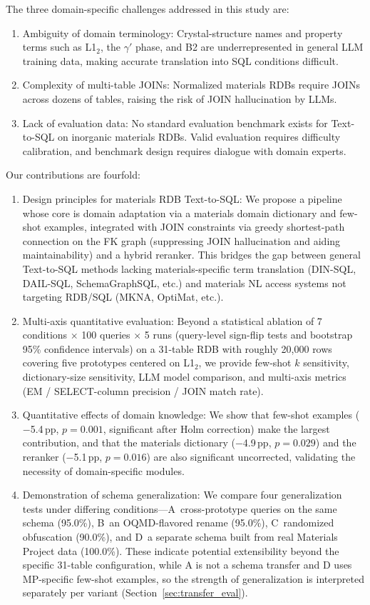 The three domain-specific challenges addressed in this study are:
\begin{enumerate}
  \item Ambiguity of domain terminology:
    Crystal-structure names and property terms such as L1$_2$, the $\gamma'$ phase, and B2 are underrepresented in general LLM training data, making accurate translation into SQL conditions difficult.
  \item Complexity of multi-table JOINs:
    Normalized materials RDBs require JOINs across dozens of tables, raising the risk of JOIN hallucination by LLMs.
  \item Lack of evaluation data:
    No standard evaluation benchmark exists for Text-to-SQL on inorganic materials RDBs. Valid evaluation requires difficulty calibration, and benchmark design requires dialogue with domain experts.
\end{enumerate}

Our contributions are fourfold:
\begin{enumerate}[label=(\roman*)]
  \item Design principles for materials RDB Text-to-SQL:
    We propose a pipeline whose core is domain adaptation via a materials domain dictionary and few-shot examples, integrated with JOIN constraints via greedy shortest-path connection on the FK graph (suppressing JOIN hallucination and aiding maintainability) and a hybrid reranker.
    This bridges the gap between general Text-to-SQL methods lacking materials-specific term translation (DIN-SQL, DAIL-SQL, SchemaGraphSQL, etc.) and materials NL access systems not targeting RDB/SQL (MKNA, OptiMat, etc.).
  \item Multi-axis quantitative evaluation:
    Beyond a statistical ablation of 7 conditions $\times$ 100 queries $\times$ 5 runs (query-level sign-flip tests and bootstrap 95\% confidence intervals) on a 31-table RDB with roughly 20,000 rows covering five prototypes centered on L1$_2$, we provide few-shot $k$ sensitivity, dictionary-size sensitivity, LLM model comparison, and multi-axis metrics (EM / SELECT-column precision / JOIN match rate).
  \item Quantitative effects of domain knowledge:
    We show that few-shot examples ($-$5.4\,pp, $p=0.001$, significant after Holm correction) make the largest contribution, and that the materials dictionary ($-$4.9\,pp, $p=0.029$) and the reranker ($-$5.1\,pp, $p=0.016$) are also significant uncorrected, validating the necessity of domain-specific modules.
  \item Demonstration of schema generalization:
    We compare four generalization tests under differing conditions---A~cross-prototype queries on the same schema (95.0\%), B~an OQMD-flavored rename (95.0\%), C~randomized obfuscation (90.0\%), and D~a separate schema built from real Materials Project data (100.0\%). These indicate potential extensibility beyond the specific 31-table configuration, while A is not a schema transfer and D uses MP-specific few-shot examples, so the strength of generalization is interpreted separately per variant (Section~\ref{sec:transfer_eval}).
\end{enumerate}

